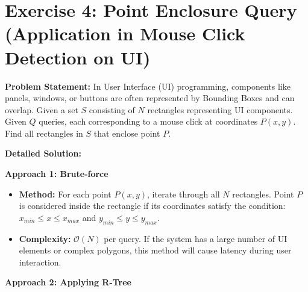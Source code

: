 \documentclass[a4paper, 10pt, titlepage]{report}
\begin{document}
\vspace{0.5cm}

\section{Exercise 4: Point Enclosure Query (Application in Mouse Click Detection on UI)}
\textbf{Problem Statement:}
In User Interface (UI) programming, components like panels, windows, or buttons are often represented by Bounding Boxes and can overlap. Given a set $S$ consisting of $N$ rectangles representing UI components. Given $Q$ queries, each corresponding to a mouse click at coordinates $P(x, y)$. Find all rectangles in $S$ that enclose point $P$.

\textbf{Detailed Solution:}

\textbf{Approach 1: Brute-force}
\begin{itemize}
    \item \textbf{Method:} For each point $P(x, y)$, iterate through all $N$ rectangles. Point $P$ is considered inside the rectangle if its coordinates satisfy the condition: $x_{min} \le x \le x_{max}$ and $y_{min} \le y \le y_{max}$.
    \item \textbf{Complexity:} $\mathcal{O}(N)$ per query. If the system has a large number of UI elements or complex polygons, this method will cause latency during user interaction.
\end{itemize}

\textbf{Approach 2: Applying R-Tree}
\end{document}
